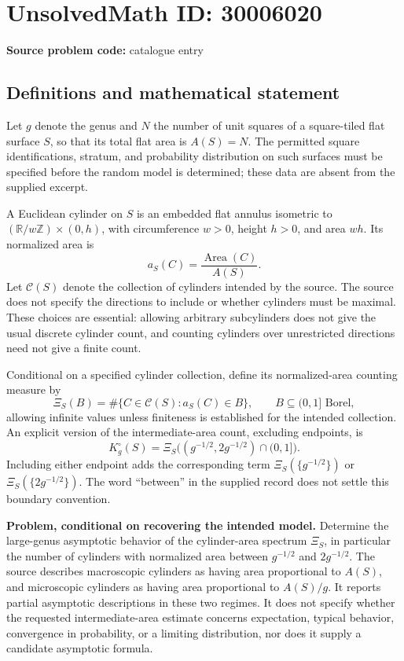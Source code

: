 \documentclass[11pt]{article}
\newcommand{\Z}{\mathbb{Z}}
\newcommand{\R}{\mathbb{R}}
\begin{document}
\section*{UnsolvedMath ID: 30006020}
\textbf{Source problem code:} catalogue entry
\subsection{Definitions and mathematical statement}
Let \(g\) denote the genus and \(N\) the number of unit squares of a square-tiled flat surface \(S\), so that its total flat area is \(A(S)=N\). The permitted square identifications, stratum, and probability distribution on such surfaces must be specified before the random model is determined; these data are absent from the supplied excerpt.

A Euclidean cylinder on \(S\) is an embedded flat annulus isometric to \((\R/w\Z)\times(0,h)\), with circumference \(w>0\), height \(h>0\), and area \(wh\). Its normalized area is
\[
 a_S(C)=\frac{\operatorname{Area}(C)}{A(S)}.
\]
Let \(\mathscr C(S)\) denote the collection of cylinders intended by the source. The source does not specify the directions to include or whether cylinders must be maximal. These choices are essential: allowing arbitrary subcylinders does not give the usual discrete cylinder count, and counting cylinders over unrestricted directions need not give a finite count.

Conditional on a specified cylinder collection, define its normalized-area counting measure by
\[
 \Xi_S(B)=\#\{C\in\mathscr C(S):a_S(C)\in B\},
 \qquad B\subseteq(0,1]\text{ Borel},
\]
allowing infinite values unless finiteness is established for the intended collection. An explicit version of the intermediate-area count, excluding endpoints, is
\[
 K_g^{\circ}(S)=\Xi_S\bigl((g^{-1/2},2g^{-1/2})\cap(0,1]\bigr).
\]
Including either endpoint adds the corresponding term \(\Xi_S(\{g^{-1/2}\})\) or \(\Xi_S(\{2g^{-1/2}\})\). The word ``between'' in the supplied record does not settle this boundary convention.

\textbf{Problem, conditional on recovering the intended model.} Determine the large-genus asymptotic behavior of the cylinder-area spectrum \(\Xi_S\), in particular the number of cylinders with normalized area between \(g^{-1/2}\) and \(2g^{-1/2}\). The source describes macroscopic cylinders as having area proportional to \(A(S)\), and microscopic cylinders as having area proportional to \(A(S)/g\). It reports partial asymptotic descriptions in these two regimes. It does not specify whether the requested intermediate-area estimate concerns expectation, typical behavior, convergence in probability, or a limiting distribution, nor does it supply a candidate asymptotic formula.
\end{document}
